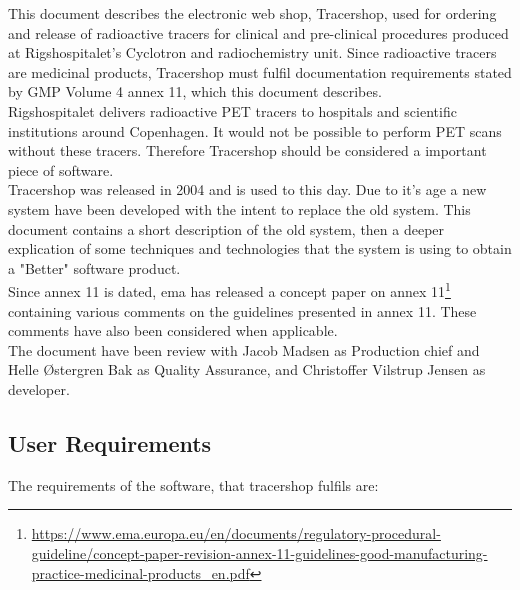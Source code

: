\documentclass{article}
\begin{document}
This document describes the electronic web shop, Tracershop, used for ordering
and release of radioactive tracers for clinical and pre-clinical procedures
produced at Rigshospitalet's Cyclotron and radiochemistry unit. Since
radioactive tracers are medicinal products, Tracershop must fulfil
documentation requirements stated by GMP Volume 4 annex 11, which this document
describes.\\
Rigshospitalet delivers radioactive PET tracers to hospitals and scientific
institutions around Copenhagen. It would not be possible to perform PET scans
without these tracers. Therefore Tracershop should be considered a important
piece of software.\\
Tracershop was released in 2004 and is used to this day. Due to it's age a new
system have been developed with the intent to replace the old system. This
document contains a short description of the old system, then a deeper
explication of some techniques and technologies that the system is using to
obtain a "Better" software product.\\
Since annex 11 is dated, \gls*{ema} has released a concept paper on annex 11\footnote{
\url{https://www.ema.europa.eu/en/documents/regulatory-procedural-guideline/concept-paper-revision-annex-11-guidelines-good-manufacturing-practice-medicinal-products_en.pdf}}
containing various comments on the guidelines presented in annex 11.
These comments have also been considered when applicable. \\
The document have been review with Jacob Madsen as Production chief and Helle
Østergren Bak as Quality Assurance, and Christoffer Vilstrup Jensen as
developer.

\subsection*{User Requirements}

The requirements of the software, that tracershop fulfils are:
\end{document}
